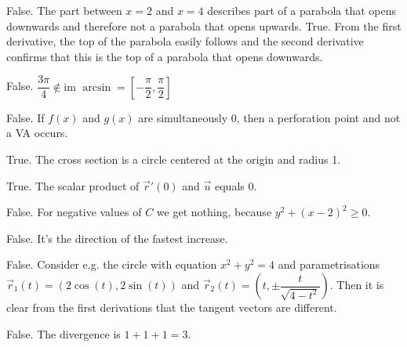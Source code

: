 \begin{Answer}
\Question False. The part between $x=2$ and $x=4$ describes part of a parabola that opens downwards and therefore not a parabola that opens upwards.
\Question True. From the first derivative, the top of the parabola easily follows and the second derivative confirms that this is the top of a parabola that opens downwards.

	
\Question False. $\dfrac{3\pi}{4}\notin \mbox{im } \arcsin = \left[-\dfrac{\pi}{2},\dfrac{\pi}{2}\right]$
	
\Question False. If $f(x)$ and $g(x)$ are simultaneously 0, then a perforation point and not a VA occurs.
	
\Question True. The cross section is a circle centered at the origin and radius 1.
		
\Question True. The scalar product of $\vec{r}'(0)$ and $\vec{u}$ equals 0.

\Question False. For negative values of $C$ we get nothing, because $y^2+(x-2)^2\geq 0$.
	
\Question False. It's the direction of the fastest increase.
	
\Question False. Consider e.g. the circle with equation $x^2+y^2=4$ and parametrisations $\vec{r}_1(t)=(2\cos(t),2\sin(t))$ and $\vec{r}_2(t)=\left(t,\pm\dfrac{t}{\sqrt{4-t^2}}\right)$. Then it is clear from the first derivations that the tangent vectors are different.

\Question False. The divergence is $1+1+1 = 3$.
\end{Answer}


